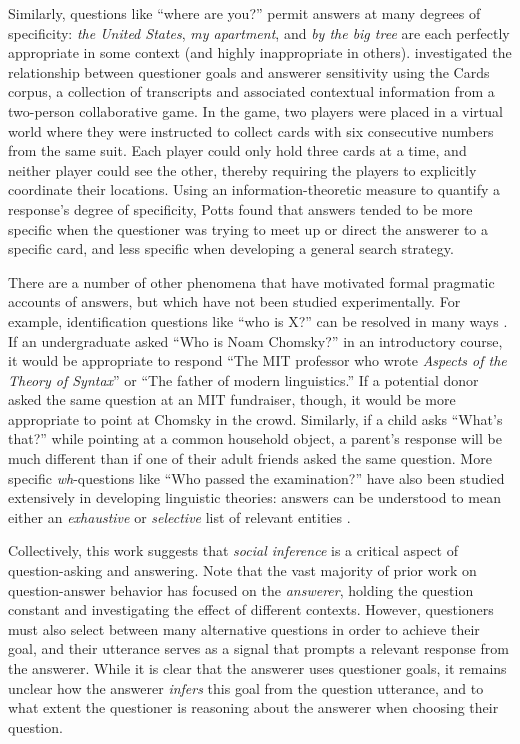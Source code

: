 \documentclass[12pt, floatsintext, jou]{apa6}
\begin{document}
Similarly, questions like ``where are you?'' permit answers at many degrees of specificity: \emph{the United States}, \emph{my apartment}, and \emph{by the big tree} are each perfectly appropriate in some context (and highly inappropriate in others). 
 investigated the relationship between questioner goals and answerer sensitivity using the Cards corpus, a collection of transcripts and associated contextual information from a two-person collaborative game. 
In the game, two players were placed in a virtual world where they were instructed to collect cards with six consecutive numbers from the same suit. Each player could only hold three cards at a time, and neither player could see the other, thereby requiring the players to explicitly coordinate their locations. 
Using an information-theoretic measure to quantify a response's degree of specificity, Potts found that answers tended to be more specific when the questioner was trying to meet up or direct the answerer to a specific card, and less specific when developing a general search strategy. 

There are a number of other phenomena that have motivated formal pragmatic accounts of answers, but which have not been studied experimentally. 
For example, identification questions like ``who is X?'' can be resolved in many ways  \cite{BoerLycan75_KnowingWho, Gerbrandy00_Identity, Aloni05_ConceptualCovers}. 
If an undergraduate asked ``Who is Noam Chomsky?'' in an introductory course, it would be appropriate to respond ``The MIT professor who wrote \emph{Aspects of the Theory of Syntax}'' or ``The father of modern linguistics.'' If a potential donor asked the same question at an MIT fundraiser, though, it would be more appropriate to point at Chomsky in the crowd. 
Similarly, if a child asks ``What's that?'' while pointing at a common household object, a parent's response will be much different than if one of their adult friends asked the same question. More specific \emph{wh}-questions like ``Who passed the examination?'' have also been studied extensively in developing linguistic theories: answers can be understood to mean either an \emph{exhaustive} or \emph{selective} list of relevant entities \cite{SchulzVanRooij06_ExhaustiveInterpretation}.

Collectively, this work suggests that \emph{social inference} is a critical aspect of question-asking and answering. Note that the vast majority of prior work on question-answer behavior has focused on the \emph{answerer}, holding the question constant and investigating the effect of different contexts. 
However, questioners must also select between many alternative questions in order to achieve their goal, and their utterance serves as a signal that prompts a relevant response from the answerer. While it is clear that the answerer uses questioner goals, it remains unclear how the answerer \emph{infers} this goal from the question utterance, and to what extent the questioner is reasoning about the answerer when choosing their question. 
\end{document}
